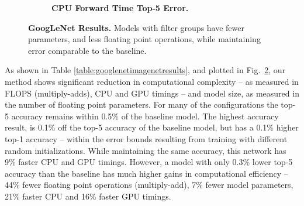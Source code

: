 \documentclass[thesis]{subfiles}
\begin{document}
\begin{figure}[tbp]
\begin{subfigure}[b]{\linewidth}
			\centering
			\caption{\textbf{CPU Forward Time \vs Top-5 Error.}}
			\label{fig:googlenet50cpuforward}
		\end{subfigure}
		
		\caption{\textbf{GoogLeNet Results.} Models with filter groups have fewer parameters, and less floating point operations, while maintaining error comparable to the baseline.}
		\label{fig:googlenet50plots}
	\end{figure}
	
	As shown in Table \ref{table:googlenetimagenetresults}, and plotted in Fig.~\ref{fig:googlenet50plots}, our method shows significant reduction in computational complexity -- as measured in FLOPS (multiply-adds), CPU and GPU timings -- and model size, as measured in the number of floating point parameters. For many of the configurations the top-5 accuracy remains within 0.5\% of the baseline model. 
	The highest accuracy result, is 0.1\% off the top-5 accuracy of the baseline model, but has a 0.1\% higher top-1 accuracy -- within the error bounds resulting from training with different random initializations. While maintaining the same accuracy, this network has 9\% faster CPU and GPU timings. However, a model with only 0.3\% lower top-5 accuracy than the baseline has much higher gains in computational efficiency -- 44\% fewer floating point operations (multiply-add), 7\% fewer model parameters, 21\% faster CPU and 16\% faster GPU timings.
	
\end{document}

